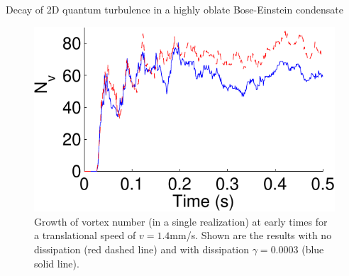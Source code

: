\begin{chapter}{\label{cha:shin}Decay of 2D quantum turbulence in a highly oblate Bose-Einstein condensate}
\begin{figure}
\centering
\includegraphics[width=0.9\linewidth]{shin/fig3}
\caption{\label{fig:N_vTime} Growth of vortex number (in a single realization) at early times for a translational speed of $v=1.4$mm/s. Shown are the results with no dissipation (red dashed line) and with dissipation $\gamma=0.0003$ (blue solid line).}
\end{figure}

\end{chapter}
